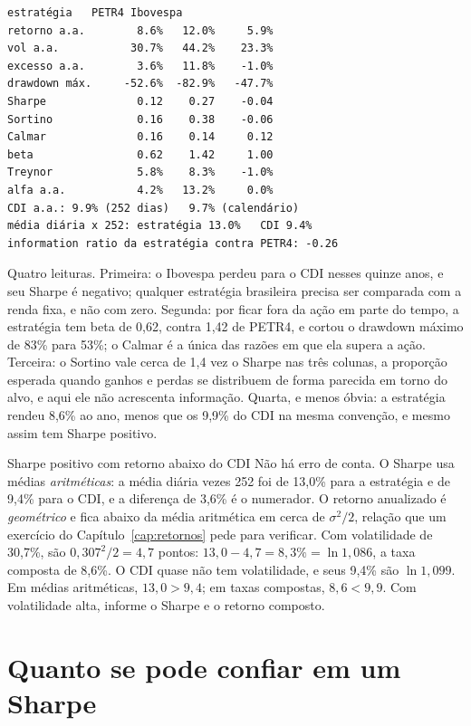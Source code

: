 \begin{lstlisting}[style=saida]
              estratégia   PETR4 Ibovespa
retorno a.a.        8.6%   12.0%     5.9%
vol a.a.           30.7%   44.2%    23.3%
excesso a.a.        3.6%   11.8%    -1.0%
drawdown máx.     -52.6%  -82.9%   -47.7%
Sharpe              0.12    0.27    -0.04
Sortino             0.16    0.38    -0.06
Calmar              0.16    0.14     0.12
beta                0.62    1.42     1.00
Treynor             5.8%    8.3%    -1.0%
alfa a.a.           4.2%   13.2%     0.0%
CDI a.a.: 9.9% (252 dias)   9.7% (calendário)
média diária x 252: estratégia 13.0%   CDI 9.4%
information ratio da estratégia contra PETR4: -0.26
\end{lstlisting}

Quatro leituras. Primeira: o Ibovespa perdeu para o CDI nesses quinze anos, e seu Sharpe é negativo; qualquer estratégia brasileira precisa ser comparada com a renda fixa, e não com zero. Segunda: por ficar fora da ação em parte do tempo, a estratégia tem beta de 0,62, contra 1,42 de PETR4, e cortou o drawdown máximo de 83\% para 53\%; o Calmar é a única das razões em que ela supera a ação. Terceira: o Sortino vale cerca de 1,4 vez o Sharpe nas três colunas, a proporção esperada quando ganhos e perdas se distribuem de forma parecida em torno do alvo, e aqui ele não acrescenta informação. Quarta, e menos óbvia: a estratégia rendeu 8,6\% ao ano, menos que os 9,9\% do CDI na mesma convenção, e mesmo assim tem Sharpe positivo.

\label{sec:c10-sharpe-cdi}
\begin{armadilha}{Sharpe positivo com retorno abaixo do CDI}
Não há erro de conta. O Sharpe usa médias \emph{aritméticas}: a média diária vezes 252 foi de 13,0\% para a estratégia e de 9,4\% para o CDI, e a diferença de 3,6\% é o numerador. O retorno anualizado é \emph{geométrico} e fica abaixo da média aritmética em cerca de $\sigma^2/2$, relação que um exercício do Capítulo~\ref{cap:retornos} pede para verificar. Com volatilidade de 30,7\%, são $0,307^2/2 = 4,7$ pontos: $13,0 - 4,7 = 8,3\% = \ln 1,086$, a taxa composta de 8,6\%. O CDI quase não tem volatilidade, e seus 9,4\% são $\ln 1,099$. Em médias aritméticas, $13,0 > 9,4$; em taxas compostas, $8,6 < 9,9$. Com volatilidade alta, informe o Sharpe e o retorno composto.
\end{armadilha}

\section{Quanto se pode confiar em um Sharpe}
\label{sec:c10-incerteza}

